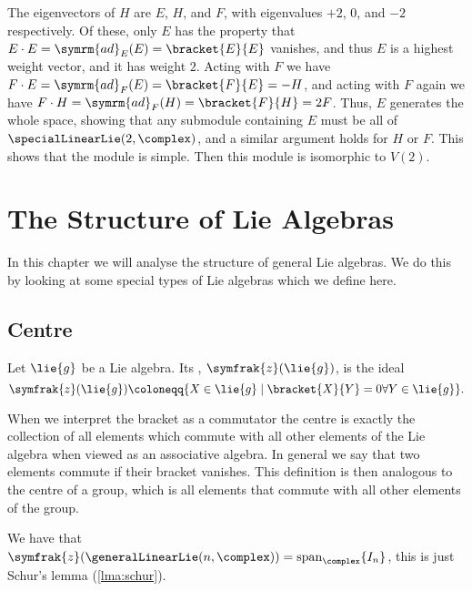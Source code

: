 \documentclass[fleqn]{NotesClass}
\DeclareMathOperator{\Span}{span}
\newcommand{\ad}{\symrm{ad}}
\newcommand{\centre}{\symfrak{z}}
\begin{document}
    The eigenvectors of \(H\) are \(E\), \(H\), and \(F\), with eigenvalues \(+2\), \(0\), and \(-2\) respectively.
    Of these, only \(E\) has the property that \(E \cdot E = \ad_E(E) = \bracket{E}{E}\) vanishes, and thus \(E\) is a highest weight vector, and it has weight \(2\).
    Acting with \(F\) we have \(F \cdot E = \ad_F(E) = \bracket{F}{E} = -H\), and acting with \(F\) again we have \(F \cdot H = \ad_F(H) = \bracket{F}{H} = 2F\).
    Thus, \(E\) generates the whole space, showing that any submodule containing \(E\) must be all of \(\specialLinearLie(2, \complex)\), and a similar argument holds for \(H\) or \(F\).
    This shows that the module is simple.
    Then this module is isomorphic to \(V(2)\).
    
    \chapter{The Structure of Lie Algebras}
    In this chapter we will analyse the structure of general Lie algebras.
    We do this by looking at some special types of Lie algebras which we define here.
    
    \section{Centre}
    \begin{dfn}{}{}
        Let \(\lie{g}\) be a Lie algebra.
        Its , \(\centre(\lie{g})\), is the ideal
        \begin{equation}
            \centre(\lie{g}) \coloneqq \{X \in \lie{g} \mid \bracket{X}{Y} = 0 \forall Y \in \lie{g}\}.
        \end{equation} 
    \end{dfn}
    
    When we interpret the bracket as a commutator the centre is exactly the collection of all elements which commute with all other elements of the Lie algebra when viewed as an associative algebra.
    In general we say that two elements commute if their bracket vanishes.
    This definition is then analogous to the centre of a group, which is all elements that commute with all other elements of the group.
    
    \begin{exm}{}{}
        We have that \(\centre(\generalLinearLie(n, \complex)) = \Span_{\complex}\{I_n\}\), this is just Schur's lemma (\cref{lma:schur}).
    \end{exm}
    
\end{document}
